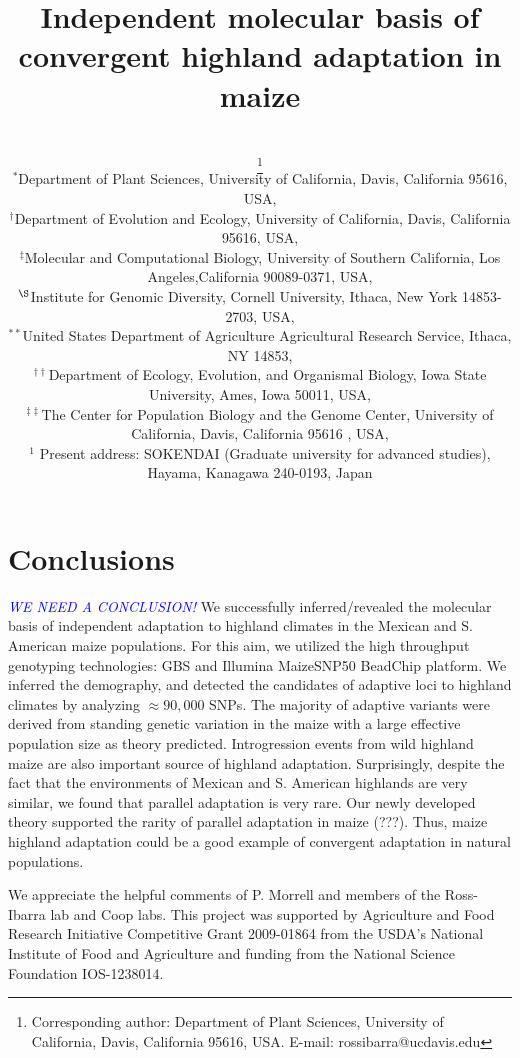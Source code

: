 \documentclass[twocolumn,twoside,letterpaper]{article}
\title{Independent molecular basis of convergent highland adaptation in maize}
\author{
 \small\sfbf{Shohei Takuno$^{\ast ,1}$, Peter Ralph$^{\dag, \ddag}$, Sofiane Mezmouk$^{\ast}$, Kelly Swarts$^{\S}$, Rob J. Elshire$^{\S}$, Jeffrey C. Glaubitz$^{\S}$,}\\
   \small\sfbf{Edward S. Buckler$^{\S, \ast\ast}$, Matthew B. Hufford$^{\ast, \dag\dag}$, and Jeffrey Ross-Ibarra$^{\ast,\ddag\ddag,}$}\thanks{
Corresponding author:  Department of Plant Sciences, University of California, Davis, California 95616, USA. 
    E-mail: \mbox{rossibarra@ucdavis.edu}}\\[0.3cm]
   \small\sf $^{\ast}$Department of Plant Sciences, University of California, Davis, California 95616, USA,\\
   \small\sf $^\dag$Department of Evolution and Ecology, University of California, Davis, California 95616, USA,\\
   \small\sf $^\ddag$Molecular and Computational Biology, University of Southern California,  Los Angeles,California 90089-0371, USA,\\
   \small\sf $^\S$Institute for Genomic Diversity, Cornell University, Ithaca, New York 14853-2703, USA,\\
   \small\sf $^{\ast\ast}$United States Department of Agriculture Agricultural Research Service, Ithaca,
NY 14853,\\
   \small\sf $^{\dag\dag}$Department of Ecology, Evolution, and Organismal Biology, Iowa State University, Ames, Iowa 50011, USA,\\
   \small\sf $^{\ddag\ddag}$The Center for Population Biology and the Genome Center, University of California, Davis, California 95616 , USA,\\
   \small\sf $^1$ Present address: SOKENDAI (Graduate university for advanced studies), Hayama, Kanagawa 240-0193, Japan
}
\newcommand{\jri}[1]{\textcolor{blue}{ \emph{\scriptsize  #1}} }
\newcommand{\st}[1]{\textcolor{red}{#1}}
\begin{document}
\maketitle







\section*{Conclusions} \jri{ WE NEED A CONCLUSION! }
We successfully inferred/revealed the molecular basis of independent adaptation to highland climates in the Mexican and S. American maize populations.
For this aim, we utilized the high throughput genotyping technologies: GBS and Illumina MaizeSNP50 BeadChip platform.
We inferred the demography, and detected the candidates of adaptive loci to highland climates by analyzing $\approx 90,000$ SNPs.
The majority of adaptive variants were derived from standing genetic variation in the maize with a large effective population size as theory predicted.
Introgression events from wild highland maize are also important source of highland adaptation.
Surprisingly, despite the fact that the environments of Mexican and S. American highlands are very similar, we found that parallel adaptation is very rare. 
Our newly developed theory supported the rarity of parallel adaptation in maize (???).
Thus, maize highland adaptation could be a good example of convergent adaptation in natural populations.





\begin{acknowledgments}
 We appreciate the helpful comments of P. Morrell and members of the Ross-Ibarra lab and Coop labs.   This project was supported by Agriculture and Food Research Initiative Competitive Grant 2009-01864 from the USDA’s National Institute of Food and Agriculture and funding from the National Science Foundation IOS-1238014.
\end{acknowledgments}




\suppl






 
\end{document}
